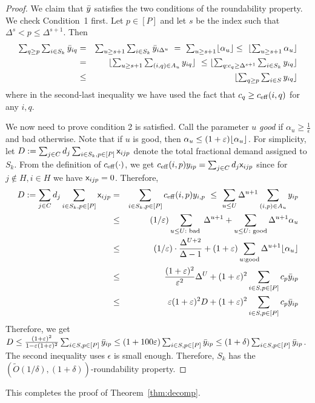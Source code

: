 \begin{proof}
We claim that $\bar{y}$ satisfies the two conditions of the roundability property. We check Condition~1 first. Let $p \in [P]$ and let $s$ be the index such that $\Delta^s < p \leq \Delta^{s+1}$. Then
\begin{eqnarray}
\textstyle \sum_{q \geq p} \sum_{i \in S_k} \y_{iq} & = & \textstyle \sum_{u \geq s+1} \sum_{i \in S_k} \y_{i\Delta^u} \ = \ \sum_{u \geq s+1} \floor{\alpha_u} \leq \textstyle \ \floor{\sum_{u \geq s+1} \alpha_u } \\
& = &  \textstyle \floor{\sum_{u \geq s+1} \sum_{(i,q) \in A_u} y_{iq}} \ \leq \floor{\sum_{q: c_q \geq \Delta^{s+1}} \sum_{i \in S_k} y_{iq} } \\
& \leq &  \textstyle\floor{\sum_{q \geq p}\sum_{i\in S} y_{iq}}
\end{eqnarray}
where in the second-last inequality  we have used the fact that $c_q \geq c_{\mathrm{eff}}(i,q)$ for any $i,q$.\smallskip
%

We now need to prove condition 2 is satisfied. 
Call the parameter $u$ {\em good} if $\alpha_u \geq \frac{1}{\epsilon}$ and bad otherwise. 
Note that if $u$ is good, then $\alpha_u \leq (1+\varepsilon)\lfloor\alpha_u\rfloor$. 
For simplicity, let 
$
D:= \sum_{j\in C} d_j \sum_{i\in S_k,p\in [P]} {\mathsf x}_{ijp}
$ denote the total fractional demand assigned to $S_k$. %
From the definition of $c_{\mathrm{eff}}(\cdot)$, we get $c_{\mathrm{eff}}(i,p)y_{ip} = \sum_{j\in C} d_j {\mathsf x}_{ijp}$ since for $j\notin H,i\in H$ we have ${\mathsf x}_{ijp} = 0$. Therefore,
\begin{eqnarray}
D := \sum_{j\in C} d_j \sum_{i\in S_k,p\in [P]} {\mathsf x}_{ijp} & = &  \sum_{i\in S_k,p\in [P]} c_{\mathrm{eff}}(i,p)y_{i,p}	\  \leq \ \sum_{u\leq U} \Delta^{u+1} \sum_{(i,p)\in A_u} y_{ip} \\
	& \leq & (1/\varepsilon)\sum_{u\le U: \textrm{ bad }} \Delta^{u+1} + \sum_{u\le U: \textrm{ good}} \Delta^{u+1} \alpha_u\\
	&	  \leq & \  (1/\varepsilon) \cdot \frac{\Delta^{U+2}}{\Delta - 1} + (1+\varepsilon) \sum_{u: \textrm{good}}\Delta^{u+1} \lfloor\alpha_u\rfloor  \\
																				& \leq & \frac{(1+\varepsilon)^2}{\varepsilon^2}\Delta^U + (1+\varepsilon)^2 \sum_{i\in S,p\in [P]}c_p\bar{y}_{ip} \\
																				& \leq & \varepsilon(1+\varepsilon)^2 D + (1+\varepsilon)^2 \sum_{i\in S,p\in [P]}c_p\bar{y}_{ip} 
\end{eqnarray}
Therefore, we get $D \leq \frac{(1+\varepsilon)^2}{1 - \varepsilon(1+\varepsilon)^2}\sum_{i\in S,p\in [P]} \bar{y}_{ip} \leq (1+100\varepsilon)\sum_{i\in S,p\in [P]} \bar{y}_{ip} \leq (1+\delta)\sum_{i\in S,p\in [P]} \bar{y}_{ip}$. 
The second inequality uses $\epsilon$ is small enough.
Therefore, $S_k$ has the $\left(\tilde{O}(1/\delta),(1+\delta)\right)$-roundability property.
\end{proof}
\noindent
This completes the proof of Theorem~\ref{thm:decomp}. 

